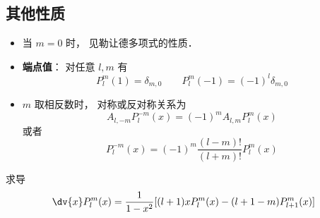 \subsection{其他性质}
\begin{itemize}
\item 当 $m = 0$ 时， 见勒让德多项式的性质．

\item \textbf{端点值}： 对任意 $l, m$ 有
\begin{equation}\label{AsLgdr_eq2}
P_l^m(1) = \delta_{m, 0}
\qquad
P_l^m(-1) = (-1)^l \delta_{m, 0}
\end{equation}

\item $m$ 取相反数时， 对称或反对称关系为
\begin{equation}
A_{l,-m} P_l^{-m}(x) = (-1)^m A_{l,m} P_l^m(x)
\end{equation}
或者
\begin{equation}
P_l^{-m}(x) = (-1)^m \frac{(l-m)!}{(l+m)!} P_l^m(x)
\end{equation}
\end{itemize}

求导
\begin{equation}
\dv{x} P_l^m(x) = \frac{1}{1-x^2} [(l+1)xP_l^m(x) - (l+1-m)P_{l+1}^m(x)]
\end{equation}
